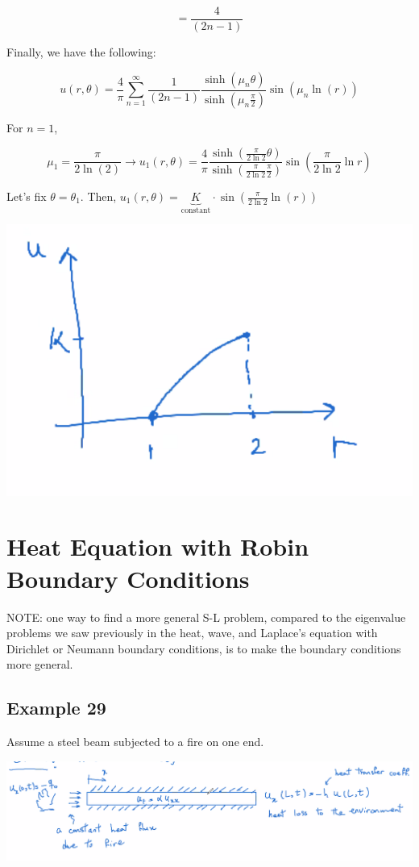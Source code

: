 \documentclass{article}
\begin{document}
$$ = \frac{4}{(2n-1)}$$

Finally, we have the following:

$$u(r, \theta) = \frac{4}{\pi} \sum_{n=1}^\infty \frac{1}{(2n-1)} \frac{\sinh(\mu_n \theta)}{\sinh(\mu_n \frac{\pi}{2})} \sin (\mu_n \ln(r))$$

For $n = 1$, 

$$\mu_1 = \frac{\pi}{2 \ln(2)} \to u_1(r, \theta) = \frac{4}{\pi} \frac{\sinh(\frac{\pi}{2 \ln 2} \theta)}{\sinh( \frac{\pi}{2 \ln 2} \frac{\pi}{2})} \sin \left( \frac{\pi}{2 \ln 2} \ln r \right)$$

Let's fix $\theta = \theta_1$. Then, $u_1(r, \theta) = \underbrace{K}_{\text{constant}} \cdot \sin \left( \frac{\pi}{2 \ln 2} \ln(r) \right)$

\begin{center}
    \includegraphics[width = 0.6 \textwidth]{1.png}
\end{center}

\section{Heat Equation with Robin Boundary Conditions}

NOTE: one way to find a more general S-L problem, compared to the eigenvalue problems we saw previously in the heat, wave, and Laplace's equation with Dirichlet or Neumann boundary conditions, is to make the boundary conditions more general. 

\subsection{Example 29}

Assume a steel beam subjected to a fire on one end. 

\begin{center}
    \includegraphics[width = 0.95 \textwidth]{2.png}
\end{center}
\end{document}
